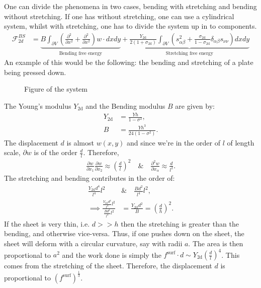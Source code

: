 \documentclass[a4paper]{article}
\newcommand{\f}{\mathcal{F}}
\begin{document}
\vspace*{.5cm}\noindent
One can divide the phenomena in two cases, bending with stretching and bending without stretching. If one has without stretching, one can use a cylindrical system, whilst with stretching, one has to divide the system up in to components.
\begin{align*}
    \f_{2d}^{BS} &= \underbrace{B\int_{\partial V}\left(\frac{\partial^2}{\partial x^2} + \frac{\partial^2}{\partial x^2}\right)w\cdot dxdy}_{\text{Bending free energy}} + \underbrace{\frac{Y_{\text{2d}}}{2(1+\sigma_{\text{2d}})}\int_{\partial V}\left(s_{\alpha\beta}^2 + \frac{\sigma_{\text{2d}}}{1-\sigma_{\text{2d}}}\delta_{\alpha\beta}s_{\nu\nu}\right)dxdy}_{\text{Stretching free energy}}
\end{align*}
An example of this would be the following: the bending and stretching of a plate being pressed down.
\begin{figure}[H]
    \centering
    \label{fig: plate bending}
    \caption{Figure of the system}
\end{figure}\noindent
The Young's modulus $Y_{\text{2d}}$ and the Bending modulus $B$ are given by:
\begin{align*}
    Y_{\text{2d}} &= \frac{Yh}{1-\sigma^2},\\
    B &= \frac{Yh^3}{24(1-\sigma^2)}.
\end{align*}The displacement $d$ is almost $w(x,y)$ and since we're in the order of $l$ of length scale, $\partial w$ is of the order $\frac{d}{l}$.
Therefore,
\begin{align*}
    \frac{\partial w}{\partial x_1}\frac{\partial w}{\partial x_2} \approx \left(\frac{d}{l}\right)^2\quad\&\quad \frac{\partial^2 w}{\partial x_\alpha} \approx \frac{d}{l^2}.
\end{align*}The stretching and bending contributes in the order of:
\begin{align*}
    \frac{Y_{\text{2d}}d^4}{l^4}l^2 \quad &\& \quad \frac{Bd^2}{l^4}l^2,\\
    \implies \frac{\frac{Y_{\text{2d}}d^4}{l^4}l^2}{\frac{Bd^2}{l^4}l^2} &=\frac{Y_{\text{2d}}d^2}{B}= \left(\frac{d}{h}\right)^2.
\end{align*}If the sheet is very thin, i.e. $d >> h$ then the stretching is greater than the bending, and otherwise vice-versa.
Thus, if one pushes down on the sheet, the sheet will deform with a circular curvature, say with radii $a$.
The area is then proportional to $a^2$ and the work done is simply the $f^{\text{surf}}\cdot d\sim Y_{\text{2d}}\left(\frac{d}{l}\right)^4$. This comes from the stretching of the sheet.
Therefore, the displacement $d$ is proportional to $\left(f^{\text{surf}}\right)^\frac{1}{3}$.
\end{document}
